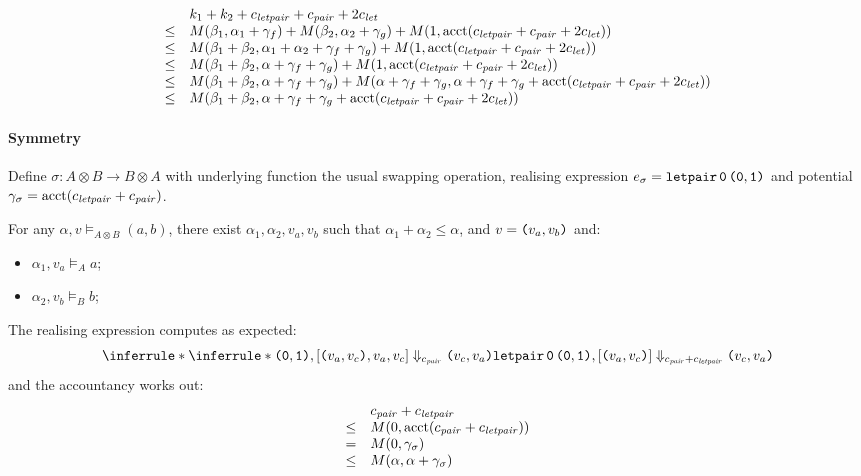 \documentclass{workingnote}
\newcommand{\account}{\mathrm{acct}}
\begin{document}
\begin{displaymath}
  \begin{array}{cl}
    & k_1+k_2+\cnstLetPair+\cnstPair+2\cnstLet \\
    \leq & M(\beta_1, \alpha_1+\gamma_f) + M(\beta_2, \alpha_2 + \gamma_g) + M(1,\account(\cnstLetPair+\cnstPair+2\cnstLet))\\
    \leq & M(\beta_1 + \beta_2, \alpha_1 + \alpha_2 + \gamma_f + \gamma_g) + M(1,\account(\cnstLetPair+\cnstPair+2\cnstLet))\\
    \leq & M(\beta_1 + \beta_2, \alpha + \gamma_f + \gamma_g) + M(1,\account(\cnstLetPair+\cnstPair+2\cnstLet))\\
    \leq & M(\beta_1 + \beta_2, \alpha + \gamma_f + \gamma_g) + M(\alpha + \gamma_f + \gamma_g,\alpha + \gamma_f + \gamma_g+\account(\cnstLetPair+\cnstPair+2\cnstLet))\\
    \leq & M(\beta_1 + \beta_2, \alpha + \gamma_f + \gamma_g+\account(\cnstLetPair+\cnstPair+2\cnstLet))\\
  \end{array}
\end{displaymath}

\paragraph{Symmetry}

Define $\sigma : A \otimes B \to B \otimes A$ with underlying function
the usual swapping operation, realising expression
$e_\sigma = \texttt{letpair}\,\texttt{0}\,\texttt{(}\texttt{0},\texttt{1}\texttt{)}$ and potential
$\gamma_\sigma = \account(\cnstLetPair + \cnstPair)$.

For any $\alpha, v \models_{A \otimes B} (a,b)$, there exist
$\alpha_1, \alpha_2,v_a,v_b$ such that
$\alpha_1 + \alpha_2 \leq \alpha$, and $v = \texttt{(}v_a,v_b\texttt{)}$ and:
\begin{itemize}
\item $\alpha_1, v_a \models_A a$;
\item $\alpha_2, v_b \models_B b$;
\end{itemize}
The realising expression computes as expected:
\begin{displaymath}
  \inferrule*
  {\inferrule* { }{\Pair{\Idx{0},\Idx{1}}, [\Pair{v_a,v_c},v_a, v_c] \Downarrow_{\cnstPair} \Pair{v_c,v_a}}}
  {\LetPair\,\Idx{0}\,\Pair{\Idx{0},\Idx{1}}, [\Pair{v_a,v_c}] \Downarrow_{\cnstPair + \cnstLetPair} \Pair{v_c,v_a}}
\end{displaymath}
and the accountancy works out:
\begin{displaymath}
  \begin{array}{cl}
    &\cnstPair + \cnstLetPair \\
    \leq &M(0,\account(\cnstPair + \cnstLetPair)) \\
    =    &M(0,\gamma_\sigma) \\
    \leq &M(\alpha, \alpha + \gamma_\sigma)
  \end{array}
\end{displaymath}
\end{document}
